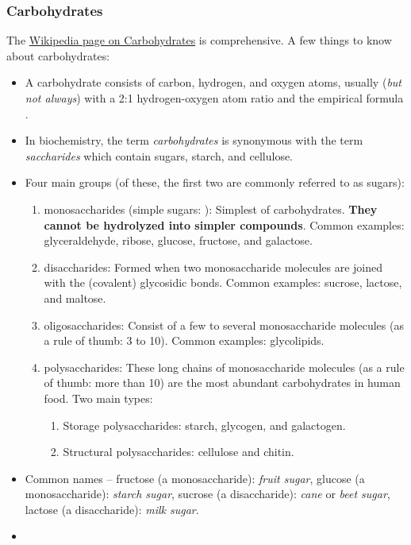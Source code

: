 \subsubsection{Carbohydrates}
The \href{https://en.wikipedia.org/wiki/Carbohydrate}{Wikipedia page on Carbohydrates} is comprehensive. A few things to know about carbohydrates:
\begin{itemize}
    \item A carbohydrate consists of carbon, hydrogen, and oxygen atoms, usually (\emph{but not always}) with a 2:1 hydrogen-oxygen atom ratio and the empirical formula .
    \item In biochemistry, the term \emph{carbohydrates} is synonymous with the term \emph{saccharides} which contain sugars, starch, and cellulose. 
    \item Four main groups (of these, the first two are commonly referred to as sugars): 
        \begin{enumerate}
            \item monosaccharides (simple sugars: ): Simplest of carbohydrates. \textbf{They cannot be hydrolyzed into simpler compounds}. Common examples: glyceraldehyde, ribose, glucose, fructose, and galactose.
            \item disaccharides: Formed when two monosaccharide molecules are joined with the (covalent) glycosidic bonds. Common examples: sucrose, lactose, and maltose.
            \item oligosaccharides: Consist of a few to several monosaccharide molecules (as a rule of thumb: 3 to 10). Common examples: glycolipids.
            \item polysaccharides: These long chains of monosaccharide molecules (as a rule of thumb: more than 10) are the most abundant carbohydrates in human food. Two main types:
            \begin{enumerate}
                \item Storage polysaccharides: starch, glycogen, and galactogen.
                \item Structural polysaccharides: cellulose and chitin.
            \end{enumerate}
        \end{enumerate}
    \item Common names -- fructose (a monosaccharide): \emph{fruit sugar}, glucose (a monosaccharide): \emph{starch sugar}, sucrose (a disaccharide): \emph{cane} or \emph{beet sugar}, lactose (a disaccharide): \emph{milk sugar}.
    \item 
\end{itemize}
